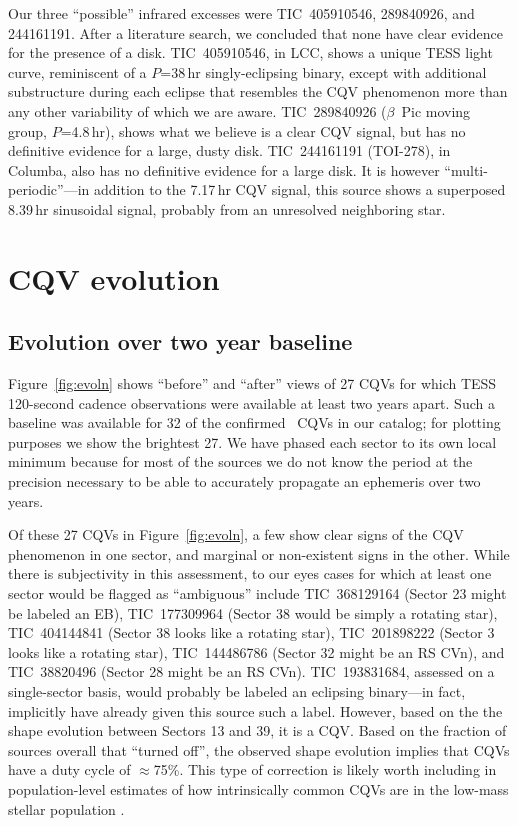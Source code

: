 \documentclass[11pt,twocolumn,tighten]{aastex63}
\begin{document}
Our three ``possible'' infrared excesses were TIC~405910546,
289840926, and 244161191.  After a literature search, we concluded
that none have clear evidence for the presence of a disk.
TIC~405910546, in LCC, shows a unique TESS light curve, reminiscent of
a $P$=38\,hr singly-eclipsing binary, except with additional
substructure during each eclipse that resembles the CQV phenomenon
more than any other variability of which we are aware.  TIC~289840926
($\beta$~Pic moving group, $P$=4.8\,hr), shows what we believe is a
clear CQV signal, but has no definitive evidence for a large, dusty
disk.  TIC~244161191 (TOI-278), in Columba, also has no
definitive evidence for a large disk.  It is however
``multi-periodic''---in addition to the 7.17\,hr CQV signal, this
source shows a superposed 8.39\,hr sinusoidal signal, probably from an
unresolved neighboring star.


\section{CQV evolution}
\label{sec:evoln}

\subsection{Evolution over two year baseline}

Figure~\ref{fig:evoln} shows ``before'' and ``after'' views of 27 CQVs
for which TESS 120-second cadence observations were available at least
two years apart.  Such a baseline was available for 32 of the
confirmed \ngoods\ CQVs in our catalog; for plotting purposes we show
the brightest 27.  
We have phased each sector to its own local minimum because for most of the
sources we do not know the period at the precision necessary to be able to
accurately propagate an ephemeris over two years.

Of these 27 CQVs in Figure~\ref{fig:evoln}, a few show clear signs of the
CQV phenomenon in one sector, and marginal or non-existent signs in the
other.  While there is subjectivity in this assessment, to our
eyes cases for which at least one sector would be flagged as
``ambiguous'' include
TIC~368129164 (Sector 23 might be labeled an EB),
TIC~177309964 (Sector 38 would be simply a rotating star),
TIC~404144841 (Sector 38 looks like a rotating star),
TIC~201898222 (Sector 3 looks like a rotating star),
TIC~144486786 (Sector 32 might be an RS CVn),
and
TIC~38820496 (Sector 28 might be an RS CVn).
TIC~193831684, assessed on a single-sector basis, would probably be
labeled an eclipsing binary---in fact, \citet{2021ApJ...912..123J}
implicitly have already given this source such a label.  However,
based on the the shape evolution between Sectors 13 and 39, it is a
CQV.  
Based on the fraction of sources overall that ``turned off'', the
observed shape evolution implies that CQVs have a duty cycle of
$\approx$75\%.
This type of correction is likely worth including in population-level
estimates of how intrinsically common CQVs are in the low-mass stellar
population \citep[e.g.][]{2022AJ....163..144G}.
\end{document}
